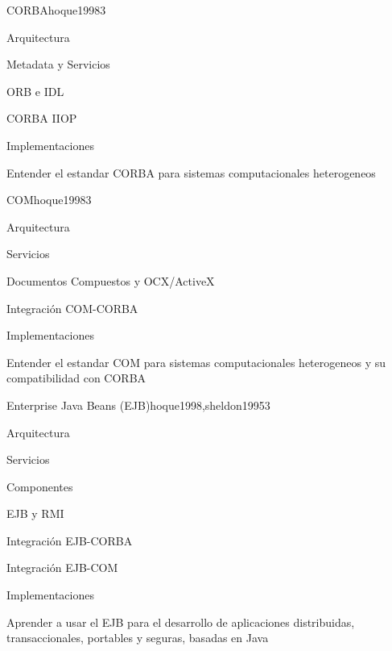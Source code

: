 \begin{syllabus}
\begin{unit}{CORBA}{hoque1998}{3}
   \begin{topics}
      \item Arquitectura
      \item Metadata y Servicios
      \item ORB e IDL
      \item CORBA IIOP
      \item Implementaciones
   \end{topics}

   \begin{unitgoals}
      \item Entender el estandar CORBA para sistemas computacionales heterogeneos
   \end{unitgoals}
\end{unit}

\begin{unit}{COM}{hoque1998}{3}
   \begin{topics}
      \item Arquitectura
      \item Servicios
      \item Documentos Compuestos y OCX/ActiveX
      \item Integración COM-CORBA
      \item Implementaciones
   \end{topics}

   \begin{unitgoals}
      \item  Entender el estandar COM para sistemas computacionales heterogeneos y su compatibilidad con CORBA
   \end{unitgoals}
\end{unit}

\begin{unit}{Enterprise Java Beans (EJB)}{hoque1998,sheldon1995}{3}
   \begin{topics}
      \item Arquitectura
      \item Servicios
      \item Componentes
      \item EJB y RMI
      \item Integración EJB-CORBA
      \item Integración EJB-COM
      \item Implementaciones
   \end{topics}

   \begin{unitgoals}
      \item Aprender a usar el EJB para el desarrollo de aplicaciones distribuidas, transaccionales, portables y seguras, basadas en Java
   \end{unitgoals}
\end{unit}


\end{syllabus}

